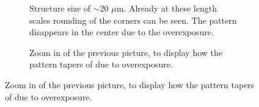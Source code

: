  \begin{figure}[htb]
     \centering
     \begin{subfigure}[t]{0.24\linewidth}
  	\centering
  	\caption{Structure size of $\sim$20 $\mu$m. Already at these length scales rounding of the corners can be seen. The pattern disappears in the center due to the overexposure.}
  	\label{fig:b2d22_q22}
  \end{subfigure}
 \hfill
     \begin{subfigure}[t]{0.24\linewidth}
  	\centering
  	\caption{Zoom in of the previous picture, to display how the pattern tapers of due to overexposure.}

\end{subfigure}
\end{figure}
